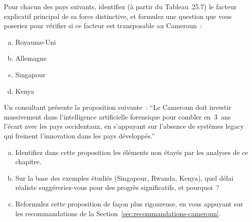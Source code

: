 \bigskip

\begin{boxexo}[title={\ding{45}\quad Exercice~25.1. Identifier les facteurs explicatifs \niveaubase}]
Pour chacun des pays suivants, identifiez (à partir du Tableau~25.7)
le facteur explicatif principal de sa force distinctive, et formulez
une question que vous poseriez pour vérifier si ce facteur est
transposable au Cameroun~:
\begin{enumerate}[(a)]
    \item Royaume-Uni
    \item Allemagne
    \item Singapour
    \item Kenya
\end{enumerate}
\end{boxexo}

\begin{boxexo}[title={\ding{45}\quad Exercice~25.2. Analyse critique d'un discours \niveaumoyen}]
Un consultant présente la proposition suivante~: ``Le Cameroun
doit investir massivement dans l'intelligence artificielle
forensique pour combler en~3~ans l'écart avec les pays occidentaux,
en s'appuyant sur l'absence de systèmes legacy qui freinent
l'innovation dans les pays développés.''
\begin{enumerate}[(a)]
    \item Identifiez dans cette proposition les éléments non
          étayés par les analyses de ce chapitre.
    \item Sur la base des exemples étudiés (Singapour, Rwanda,
          Kenya), quel délai réaliste suggéreriez-vous pour des
          progrès significatifs, et pourquoi~?
    \item Reformulez cette proposition de façon plus rigoureuse,
          en vous appuyant sur les recommandations de la
          Section~\ref{sec:recommandations-cameroun}.
\end{enumerate}
\end{boxexo}

